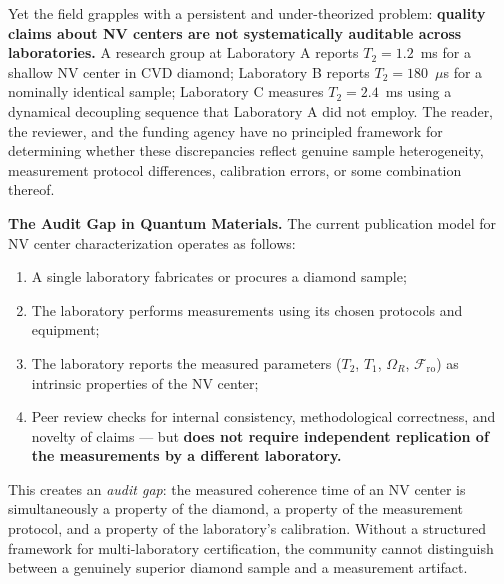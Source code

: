 \documentclass[11pt,a4paper]{article}
\theoremstyle{definition}
\newcommand{\Ttwo}{T_2}
\newcommand{\Tone}{T_1}
\newcommand{\NV}{NV}
\newcommand{\RabiFreq}{\Omega_R}
\newcommand{\FidReadout}{\mathcal{F}_{\text{ro}}}
\begin{document}
Yet the field grapples with a persistent and under-theorized problem: \textbf{quality claims about \NV{} centers are not systematically auditable across laboratories.} A research group at Laboratory A reports $\Ttwo = 1.2$~ms for a shallow \NV{} center in CVD diamond; Laboratory B reports $\Ttwo = 180$~$\mu$s for a nominally identical sample; Laboratory C measures $\Ttwo = 2.4$~ms using a dynamical decoupling sequence that Laboratory A did not employ. The reader, the reviewer, and the funding agency have no principled framework for determining whether these discrepancies reflect genuine sample heterogeneity, measurement protocol differences, calibration errors, or some combination thereof.

\medskip
\noindent\textbf{The Audit Gap in Quantum Materials.} The current publication model for \NV{} center characterization operates as follows:
\begin{enumerate}[label=(\roman*)]
    \item A single laboratory fabricates or procures a diamond sample;
    \item The laboratory performs measurements using its chosen protocols and equipment;
    \item The laboratory reports the measured parameters ($\Ttwo$, $\Tone$, $\RabiFreq$, $\FidReadout$) as intrinsic properties of the \NV{} center;
    \item Peer review checks for internal consistency, methodological correctness, and novelty of claims — but \textbf{does not require independent replication of the measurements by a different laboratory.}
\end{enumerate}
This creates an \textit{audit gap}: the measured coherence time of an \NV{} center is simultaneously a property of the diamond, a property of the measurement protocol, and a property of the laboratory's calibration. Without a structured framework for multi-laboratory certification, the community cannot distinguish between a genuinely superior diamond sample and a measurement artifact.
\end{document}
